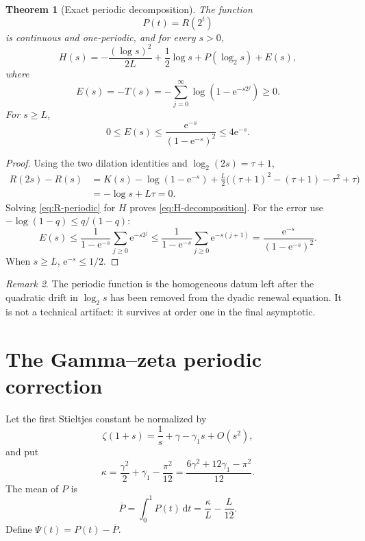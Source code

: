\documentclass[11pt]{article}
\newtheorem{theorem}{Theorem}[section]
\theoremstyle{definition}
\theoremstyle{remark}
\newtheorem{remark}[theorem]{Remark}
\newcommand{\dd}{\,\mathrm d}\newcommand{\e}{\mathrm e}\newcommand{\ii}{\mathrm i}
\begin{document}
\begin{theorem}[Exact periodic decomposition]\label{thm:H-decomposition}
The function
\[
 P(t)=R(2^t)
\]
is continuous and one-periodic, and for every $s>0$,
\begin{equation}\label{eq:H-decomposition}
\boxed{
 H(s)=-\frac{(\log s)^2}{2L}+\frac12\log s
 +P(\log_2s)+E(s),}
\end{equation}
where
\begin{equation}\label{eq:E-def}
 E(s)=-T(s)=-\sum_{j=0}^{\infty}\log(1-\e^{-s2^j})\ge0.
\end{equation}
For $s\ge L$,
\begin{equation}\label{eq:E-bound}
 0\le E(s)\le\frac{\e^{-s}}{(1-\e^{-s})^2}\le4\e^{-s}.
\end{equation}
\end{theorem}
\begin{proof}
Using the two dilation identities and $\log_2(2s)=\tau+1$,
\begin{align*}
 R(2s)-R(s)
 &=K(s)-\log(1-\e^{-s})
 +\frac L2\bigl((\tau+1)^2-(\tau+1)-\tau^2+\tau\bigr)\\
 &=-\log s+L\tau=0.
\end{align*}
Solving \eqref{eq:R-periodic} for $H$ proves \eqref{eq:H-decomposition}.  For the error use $-\log(1-q)\le q/(1-q)$:
\[
 E(s)\le\frac1{1-\e^{-s}}\sum_{j\ge0}\e^{-s2^j}
 \le\frac1{1-\e^{-s}}\sum_{j\ge0}\e^{-s(j+1)}
 =\frac{\e^{-s}}{(1-\e^{-s})^2}.
\]
When $s\ge L$, $\e^{-s}\le1/2$.
\end{proof}

\begin{remark}
The periodic function is the homogeneous datum left after the quadratic drift in $\log_2s$ has been removed from the dyadic renewal equation.  It is not a technical artifact: it survives at order one in the final asymptotic.
\end{remark}

\section{The Gamma--zeta periodic correction}\label{sec:periodic}
Let the first Stieltjes constant be normalized by
\begin{equation}\label{eq:Stieltjes}
 \zeta(1+s)=\frac1s+\gamma-\gamma_1s+O(s^2),
\end{equation}
and put
\begin{equation}\label{eq:kappa}
 \kappa=\frac{\gamma^2}{2}+\gamma_1-\frac{\pi^2}{12}
 =\frac{6\gamma^2+12\gamma_1-\pi^2}{12}.
\end{equation}
The mean of $P$ is
\begin{equation}\label{eq:P-mean}
 \overline P=\int_0^1P(t)\dd t=\frac\kappa L-\frac L{12}.
\end{equation}
Define $\Psi(t)=P(t)-\overline P$.
\end{document}
